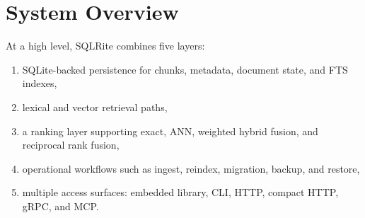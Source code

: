 \documentclass[11pt]{article}
\begin{document}
\section{System Overview}
At a high level, SQLRite combines five layers:
\begin{enumerate}[leftmargin=*, itemsep=0.2em]
  \item SQLite-backed persistence for chunks, metadata, document state, and FTS indexes,
  \item lexical and vector retrieval paths,
  \item a ranking layer supporting exact, ANN, weighted hybrid fusion, and reciprocal rank fusion,
  \item operational workflows such as ingest, reindex, migration, backup, and restore,
  \item multiple access surfaces: embedded library, CLI, HTTP, compact HTTP, gRPC, and MCP.
\end{enumerate}
\end{document}
